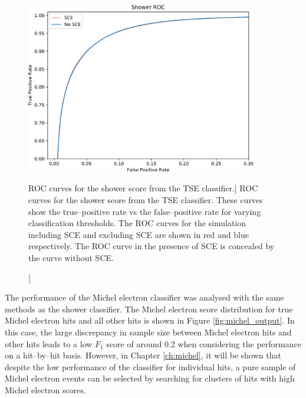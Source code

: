 \begin{figure}
	\centering
	\includegraphics[width=0.9\textwidth]{figures/show_roc_comparison.pdf}
	\caption
	[ROC curves for the shower score from the TSE classifier.]
	{ROC curves for the shower score from the TSE classifier. These curves show
	the true--positive rate vs the false--positive rate for varying classification
	thresholds. The ROC curves for the \protodune{} simulation including SCE and
	excluding SCE are shown in red and blue respectively. The ROC curve in the
	presence of SCE is concealed by the curve without SCE.}
	\label{fig:show_roc}
\end{figure}

The performance of the Michel electron classifier was analysed with the same
methods as the shower classifier. The Michel electron score distribution for
true Michel electron hits and all other hits is shown in Figure
\ref{fig:michel_output}. In this case, the large discrepancy in sample size
between Michel electron hits and other hits leads to a low $F_1$ score of around
0.2 when considering the performance on a hit--by--hit basis. However, in
Chapter \ref{ch:michel}, it will be shown that despite the low performance of 
the classifier for individual hits, a pure sample of Michel electron events 
can be selected by searching for clusters of hits with high Michel electron 
scores.

